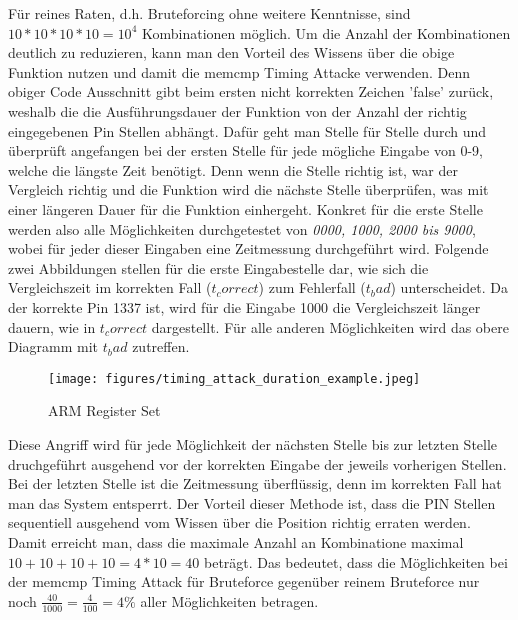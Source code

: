\documentclass[a4paper,
DIV=13,
12pt,
BCOR=10mm,
department=FakIM,
oneside,
parskip=half,
automark,
listof=totocnumbered,
bibliography=totocnumbered,
acronym=totocnumbered
] {OTHRartcl}
\begin{document}
Für reines Raten, d.h. Bruteforcing ohne weitere Kenntnisse, sind $ 10*10*10*10 = 10^4 $ Kombinationen möglich.
Um die Anzahl der Kombinationen deutlich zu reduzieren, kann man den Vorteil des Wissens über die obige Funktion nutzen und damit
die memcmp Timing Attacke verwenden.
Denn obiger Code Ausschnitt gibt beim ersten nicht korrekten Zeichen 'false' zurück, weshalb die die Ausführungsdauer der
Funktion von der Anzahl der richtig eingegebenen Pin Stellen abhängt.
Dafür geht man Stelle für Stelle durch und überprüft angefangen bei der ersten Stelle für jede mögliche Eingabe von 0-9, welche die längste Zeit benötigt.
Denn wenn die Stelle richtig ist, war der Vergleich richtig und die Funktion wird die nächste Stelle überprüfen, was mit einer längeren Dauer für die Funktion
einhergeht.
Konkret für die erste Stelle werden also alle Möglichkeiten durchgetestet von \textit{0000, 1000, 2000 bis 9000}, wobei für jeder dieser Eingaben
eine Zeitmessung durchgeführt wird.
Folgende zwei Abbildungen stellen für die erste Eingabestelle dar, wie sich die Vergleichszeit im
korrekten Fall ($t_correct$) zum Fehlerfall ($t_bad$) unterscheidet.
Da der korrekte Pin 1337 ist, wird für die Eingabe 1000 die Vergleichszeit länger dauern, wie in $t_correct$ dargestellt.
Für alle anderen Möglichkeiten wird das obere Diagramm mit $t_bad$ zutreffen.
\begin{figure}[ht!]
  \begin{center}
    \texttt{[image: figures/timing\_attack\_duration\_example.jpeg]}
    \caption{ARM Register Set}
    \label{Abbildung 1: ARM Register Set}
  \end{center}
\end{figure}
Diese Angriff wird für jede Möglichkeit der nächsten Stelle bis zur letzten Stelle druchgeführt ausgehend vor der korrekten Eingabe der jeweils vorherigen Stellen.
Bei der letzten Stelle ist die Zeitmessung überflüssig, denn im korrekten Fall hat man das System entsperrt.
Der Vorteil dieser Methode ist, dass die PIN Stellen sequentiell ausgehend vom Wissen über die Position richtig erraten werden.
Damit erreicht man, dass die maximale Anzahl an Kombinatione maximal $10+10+10+10 = 4*10 = 40 $ beträgt.
Das bedeutet, dass die Möglichkeiten bei der memcmp Timing Attack für Bruteforce gegenüber reinem Bruteforce nur noch $\frac{40}{1000} = \frac{4}{100} = 4\% $
aller Möglichkeiten betragen.
\end{document}
